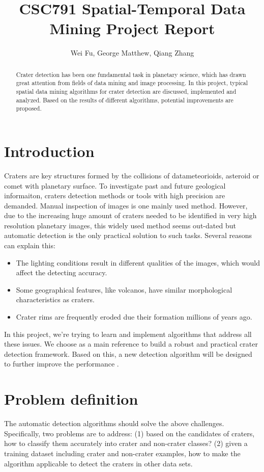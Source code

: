\documentclass[conference]{IEEEtran}
\begin{document}
\title{CSC791 Spatial-Temporal Data Mining Project Report}
\author{Wei Fu, George Matthew, Qiang Zhang} 

\maketitle
\begin{abstract}
  Crater detection has been one fundamental task in planetary science, which has drawn great attention from fields of data mining and image processing. In this project,  typical spatial data mining algorithms for crater detection are discussed, implemented and analyzed. Based on the results of different algorithms, potential improvements are proposed.
\end{abstract}
\section{Introduction}
Craters are key structures formed by the collisions of datameteorioids, asteroid or comet with planetary surface. To investigate past and future geological informaiton, craters detection methods or tools with high precision are demanded. Manual inspection of images is one mainly used method. However, due to the increasing huge amount of craters needed to be identified in very high resolution planetary images, this widely used method seems out-dated but automatic detection is the only practical solution to such tasks. Several reasons \cite{kim2005automated} can explain this:
\begin{itemize}
 \item The lighting conditions result in different qualities of the images, which would affect the detecting accuracy.
 \item Some geographical features, like volcanos, have similar morphological characteristics as craters.
 \item Crater rims are frequently eroded due their formation millions of years ago. 
\end{itemize}

In this project, we're trying to learn and implement algorithms that address all these issues. 
We choose \cite{ding2011subkilometer} as a main reference to build a robust and practical crater detection framework. Based on this, a new detection algorithm will be designed to further improve the performance .

\section{Problem definition}
The automatic detection algorithms should solve the above challenges. Specifically, two problems are to address: (1) based on the candidates of craters, how to classify them accurately into crater and non-crater classes? (2) given a training dataset including crater and non-crater examples, how to make the algorithm applicable to detect the craters in other data sets.
\end{document}

